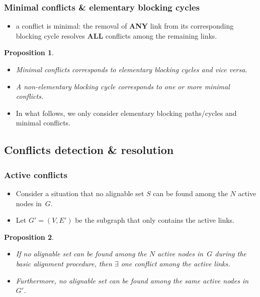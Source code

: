 \documentclass[xcolor=dvipsnames,envcountsect,handout]{beamer}
\newtheorem*{prop}{Proposition}
\begin{document}
\begin{frame}
\frametitle{Minimal conflicts \& elementary blocking cycles}
\begin{itemize}
\item a conflict is \alert{minimal}: the removal of {\bf ANY} 
link from its corresponding blocking cycle resolves {\bf ALL}
conflicts among the remaining links. 
\end{itemize}
\begin{center}
\begin{minipage}{11cm}
\begin{prop}
\begin{itemize}
\item Minimal conflicts corresponds to elementary blocking cycles and vice
versa. 
\item A non-elementary blocking cycle corresponds to one 
or more minimal conflicts. 
\end{itemize}
\end{prop}
\end{minipage}
\end{center}
\begin{itemize}
\item In what follows, we only consider elementary blocking
paths/cycles and minimal conflicts. 
\end{itemize}
\end{frame}



\subsection{Conflicts detection \& resolution}


\begin{frame}
\frametitle{Active conflicts}
\begin{itemize}
\item Consider a situation that no alignable set $S$ can be found
among the $N$ active nodes in~$G$. 
\item Let $G' = (V,E')$ be the subgraph that only contains the active
links. 
\end{itemize}
\begin{prop}
\begin{itemize}
\item If no alignable set can be found among the $N$ active nodes in~$G$ 
during the basic alignment procedure, then $\exists$ one conflict 
among the active links.
\item Furthermore, no alignable set can be found among the same 
active nodes in~$G'$. 
\end{itemize}
\end{prop}
\end{frame}
\end{document}
